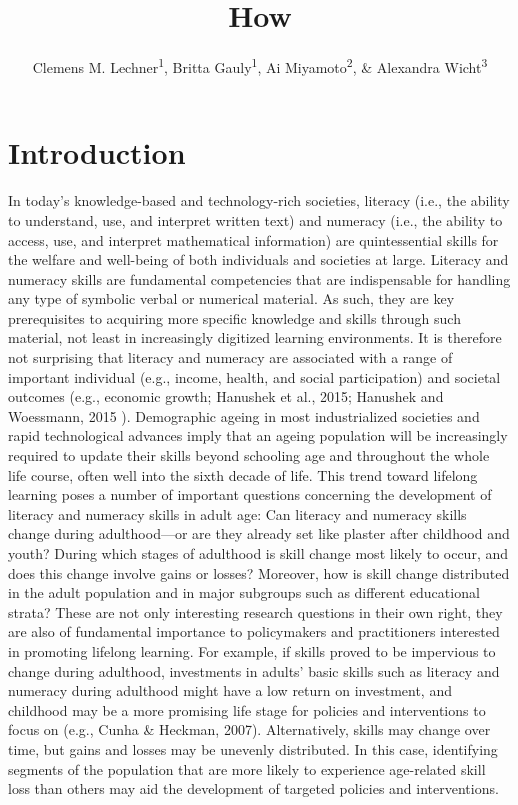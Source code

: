 \documentclass[
  english,
  man]{apa6}
\title{How}
\author{Clemens M. Lechner\textsuperscript{1}, Britta Gauly\textsuperscript{1}, Ai Miyamoto\textsuperscript{2}, \& Alexandra Wicht\textsuperscript{3}}
\date{}
\affiliation{\vspace{0.5cm}\textsuperscript{1} GESIS - Leibniz Institute for the Social Sciences, Mannheim, Germany\\\textsuperscript{2} University of Freiburg, Germany\\\textsuperscript{3} University of Siegen, Germany}
\let\footnote\endnote
\begin{document}
\maketitle

\hypertarget{introduction}{%
\section{Introduction}\label{introduction}}

In today's knowledge-based and technology-rich societies,\footnote{This is a footnote} literacy (i.e., the ability to understand, use, and interpret written text) and numeracy (i.e., the ability to access, use, and interpret mathematical information) are quintessential skills for the welfare and well-being of both individuals and societies at large. Literacy and numeracy skills are fundamental competencies that are indispensable for handling any type of symbolic verbal or numerical material. As such, they are key prerequisites to acquiring more specific knowledge and skills through such material, not least in increasingly digitized learning environments. It is therefore not surprising that literacy and numeracy are associated with a range of important individual (e.g., income, health, and social participation) and societal outcomes (e.g., economic growth; Hanushek et al., 2015; Hanushek and Woessmann, 2015 ).
Demographic ageing in most industrialized societies and rapid technological advances imply that an ageing population will be increasingly required to update their skills beyond schooling age and throughout the whole life course, often well into the sixth decade of life. This trend toward lifelong learning poses a number of important questions concerning the development of literacy and numeracy skills in adult age: Can literacy and numeracy skills change during adulthood---or are they already set like plaster after childhood and youth? During which stages of adulthood is skill change most likely to occur, and does this change involve gains or losses? Moreover, how is skill change distributed in the adult population and in major subgroups such as different educational strata? These are not only interesting research questions in their own right, they are also of fundamental importance to policymakers and practitioners interested in promoting lifelong learning. For example, if skills proved to be impervious to change during adulthood, investments in adults' basic skills such as literacy and numeracy during adulthood might have a low return on investment, and childhood may be a more promising life stage for policies and interventions to focus on (e.g., Cunha \& Heckman, 2007). Alternatively, skills may change over time, but gains and losses may be unevenly distributed. In this case, identifying segments of the population that are more likely to experience age-related skill loss than others may aid the development of targeted policies and interventions.
\end{document}
